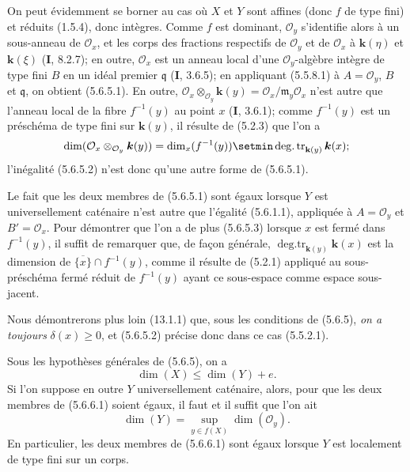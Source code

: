 On peut évidemment se borner au cas où $X$ et $Y$ sont affines (donc $f$ de
type fini) et réduits (1.5.4), donc intègres. Comme $f$ est dominant,
$\mathcal O_y$ s'identifie alors à un sous-anneau de $\mathcal O_x$, et les
corps des fractions respectifs de $\mathcal O_y$ et de $\mathcal O_x$ à
$\boldsymbol{k}(\eta)$ et $\boldsymbol{k}(\xi)$ (\textbf{I}, 8.2.7); en outre, $\mathcal O_x$ est un anneau
local d'une $\mathcal O_y$-algèbre intègre de type fini $B$ en un idéal
premier $\mathfrak q$ (\textbf{I}, 3.6.5); en appliquant (5.5.8.1) à
$A=\mathcal O_y$, $B$ et $\mathfrak q$, on obtient (5.6.5.1). En outre,
$\mathcal O_x\otimes_{\mathcal O_y}\boldsymbol{k}(y)=\mathcal O_x/\mathfrak m_y\mathcal O_x$
n'est autre que l'anneau local de la fibre $f^{-1}(y)$ au point $x$
(\textbf{I}, 3.6.1); comme $f^{-1}(y)$ est un préschéma de type fini sur $\boldsymbol{k}(y)$, il
résulte de (5.2.3) que l'on a
\[
\dim(\mathcal O_x\otimes_{\mathcal O_y}\boldsymbol{k}(y))
=\dim_x(f^{-1}(y))\setmin\operatorname{deg.tr}_{\mathbf{k}(y)}\boldsymbol{k}(x);
\]
l'inégalité (5.6.5.2) n'est donc qu'une autre forme de (5.6.5.1).

Le fait que les deux membres de (5.6.5.1) sont égaux lorsque $Y$ est
universellement
caténaire n'est autre que l'égalité (5.6.1.1), appliquée à
$A=\mathcal O_y$ et $B'=\mathcal O_x$. Pour démontrer que l'on a de plus
(5.6.5.3) lorsque $x$ est fermé dans $f^{-1}(y)$, il suffit de remarquer que,
de façon générale, $\operatorname{deg.tr}_{\mathbf{k}(y)}\boldsymbol{k}(x)$ est la dimension de
$\overline{\{x\}}\cap f^{-1}(y)$, comme il résulte de (5.2.1) appliqué au
sous-préschéma fermé réduit de $f^{-1}(y)$ ayant ce sous-espace comme espace
sous-jacent.

Nous démontrerons plus loin (13.1.1) que, sous les conditions de (5.6.5), \emph{on
a toujours} $\delta(x)\geq0$, et (5.6.5.2) précise donc dans ce cas (5.5.2.1).

\begin{corollary}[5.6.6]
\label{IV.2.s5.6.6-fr}
Sous les hypothèses générales de \textup{(5.6.5)}, on a
\begin{equation}
\dim(X)\leq\dim(Y)+e.
\tag{5.6.6.1}\label{IV.2.s5.6.6.1-fr}
\end{equation}
Si l'on suppose en outre $Y$ universellement caténaire, alors, pour que les
deux membres de \textup{(5.6.6.1)} soient égaux, il faut et il suffit que l'on ait
\begin{equation}
\dim(Y)=\sup_{y\in f(X)}\dim(\mathcal O_y).
\tag{5.6.6.2}\label{IV.2.s5.6.6.2-fr}
\end{equation}
En particulier, les deux membres de \textup{(5.6.6.1)} sont égaux lorsque $Y$ est
localement de type fini sur un corps.
\end{corollary}

